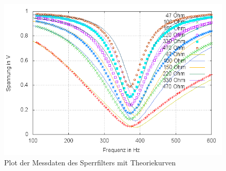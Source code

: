 \begin{figure}
        \includegraphics[width=.9\textwidth]{images/plot/sperrfilter+theorie+R_L.png}
\caption{Plot der Messdaten des Sperrfilters mit Theoriekurven}
\label{plot:sperr}
\end{figure}
